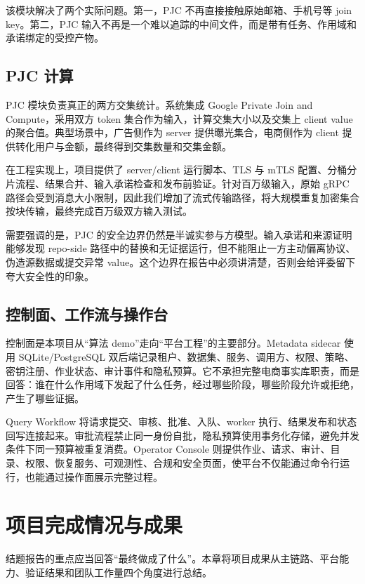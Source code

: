 \documentclass[UTF8,a4paper,12pt,oneside]{ctexrep}
\begin{document}
该模块解决了两个实际问题。第一，PJC 不再直接接触原始邮箱、手机号等 join key。第二，PJC 输入不再是一个难以追踪的中间文件，而是带有任务、作用域和承诺绑定的受控产物。

\section{PJC 计算}

PJC 模块负责真正的两方交集统计。系统集成 Google Private Join and Compute，采用双方 token 集合作为输入，计算交集大小以及交集上 client value 的聚合值。典型场景中，广告侧作为 server 提供曝光集合，电商侧作为 client 提供转化用户与金额，最终得到交集数量和交集金额。

在工程实现上，项目提供了 server/client 运行脚本、TLS 与 mTLS 配置、分桶分片流程、结果合并、输入承诺检查和发布前验证。针对百万级输入，原始 gRPC 路径会受到消息大小限制，因此我们增加了流式传输路径，将大规模重复加密集合按块传输，最终完成百万级双方输入测试。

需要强调的是，PJC 的安全边界仍然是半诚实参与方模型。输入承诺和来源证明能够发现 repo-side 路径中的替换和无证据运行，但不能阻止一方主动偏离协议、伪造源数据或提交异常 value。这个边界在报告中必须讲清楚，否则会给评委留下夸大安全性的印象。

\section{控制面、工作流与操作台}

控制面是本项目从“算法 demo”走向“平台工程”的主要部分。Metadata sidecar 使用 SQLite/PostgreSQL 双后端记录租户、数据集、服务、调用方、权限、策略、密钥注册、作业状态、审计事件和隐私预算。它不承担完整电商事实库职责，而是回答：谁在什么作用域下发起了什么任务，经过哪些阶段，哪些阶段允许或拒绝，产生了哪些证据。

Query Workflow 将请求提交、审核、批准、入队、worker 执行、结果发布和状态回写连接起来。审批流程禁止同一身份自批，隐私预算使用事务化存储，避免并发条件下同一预算被重复消费。Operator Console 则提供作业、请求、审计、目录、权限、恢复服务、可观测性、合规和安全页面，使平台不仅能通过命令行运行，也能通过操作面展示完整过程。

\chapter{项目完成情况与成果}

结题报告的重点应当回答“最终做成了什么”。本章将项目成果从主链路、平台能力、验证结果和团队工作量四个角度进行总结。
\end{document}
